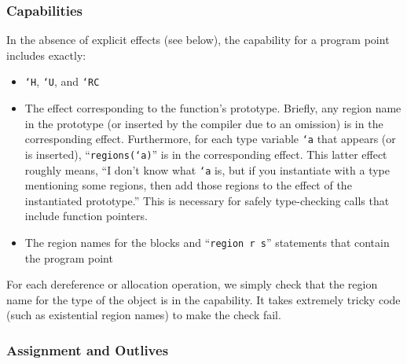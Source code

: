 \subsubsection{Capabilities}

In the absence of explicit effects (see below), the capability for a
program point includes exactly:
\begin{itemize}
\item \texttt{`H}, \texttt{`U}, and \texttt{`RC}
\item The effect corresponding to the function's prototype.  Briefly,
any region name in the prototype (or inserted by the compiler due to
an omission) is in the corresponding effect.  Furthermore, for each
type variable \texttt{`a} that appears (or is inserted),
``\texttt{regions(`a)}'' is in the corresponding effect.  This latter
effect roughly means, ``I don't know what \texttt{`a} is, but if you
instantiate with a type mentioning some regions, then add those
regions to the effect of the instantiated prototype.''  This is
necessary for safely type-checking calls that include function pointers.
\item The region names for the blocks and ``\texttt{region r s}''
  statements that contain the program point
\end{itemize}

For each dereference or allocation operation, we simply check that the
region name for the type of the object is in the capability.  It takes
extremely tricky code (such as existential region names) to make the
check fail.

\subsubsection{Assignment and Outlives}

